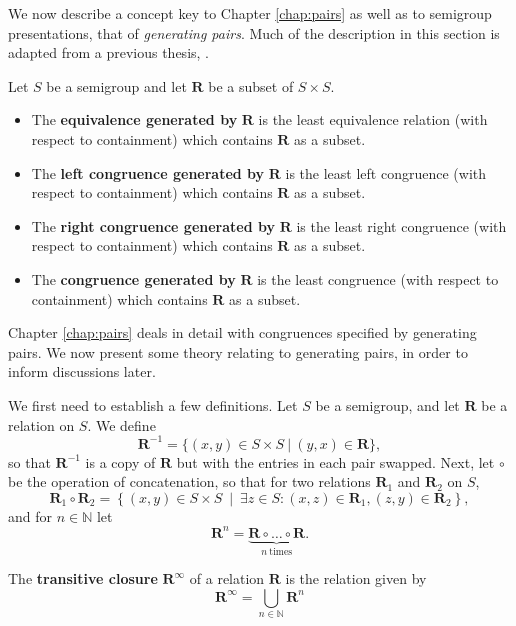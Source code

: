 We now describe a concept key to Chapter \ref{chap:pairs} as well as to
semigroup presentations, that of \textit{generating pairs}.  Much of the
description in this section is adapted from a previous thesis,
\cite{mtorpey_msc}.

\begin{definition}
  \label{def:gen-pairs}
  Let $S$ be a semigroup and let $\mathbf{R}$ be a subset of $S \times S$.
  \begin{itemize}
  \item The \textbf{equivalence generated by} $\mathbf{R}$ is the least
    equivalence relation (with respect to containment) which contains
    $\mathbf{R}$ as a subset.
  \item The \textbf{left congruence generated by} $\mathbf{R}$ is the least left
    congruence (with respect to containment) which contains $\mathbf{R}$ as a
    subset.
  \item The \textbf{right congruence generated by} $\mathbf{R}$ is the least
    right congruence (with respect to containment) which contains $\mathbf{R}$
    as a subset.
  \item The \textbf{congruence generated by} $\mathbf{R}$ is the least
    congruence (with respect to containment) which contains $\mathbf{R}$ as a
    subset.
  \end{itemize}
\end{definition}

Chapter \ref{chap:pairs} deals in detail with congruences specified by
generating pairs.  We now present some theory relating to generating pairs, in
order to inform discussions later.

We first need to establish a few definitions.  Let $S$ be a semigroup, and let
$\mathbf{R}$ be a relation on $S$.  We define
$$\mathbf{R}^{-1} = \{(x,y) \in S \times S ~|~ (y,x) \in \mathbf{R}\},$$
so that $\mathbf{R}^{-1}$ is a copy of $\mathbf{R}$ but with the entries in each
pair swapped. 
Next, let $\circ$ be the operation of concatenation, so that for two relations
$\mathbf{R}_1$ and $\mathbf{R}_2$ on $S$,
$$\mathbf{R}_1 \circ \mathbf{R}_2 = \left\{(x,y) \in S \times S ~\middle|~
  \exists z \in S: (x,z) \in \mathbf{R}_1, (z,y) \in \mathbf{R}_2\right\},$$
and for $n \in \mathbb{N}$ let
$$\mathbf{R}^n = \underbrace{\mathbf{R} \circ \dots \circ \mathbf{R}}_{n~\text{times}}.$$

\begin{definition}
  \label{def:transitiveclosure}
  The \textbf{transitive closure} $\mathbf{R}^\infty$ of a relation $\mathbf{R}$
  is the relation given by
  $$\mathbf{R}^\infty=\bigcup_{n \in \mathbb{N}}\mathbf{R}^n$$
\end{definition}

